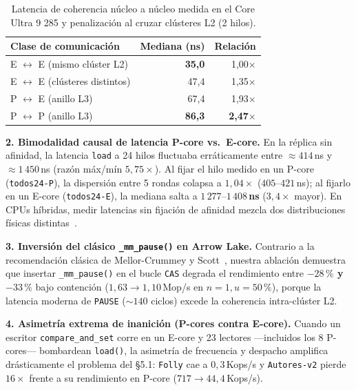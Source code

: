 \documentclass[10pt,twocolumn,a4paper]{article}
\begin{document}
\begin{table}[H]
\centering
\caption{Latencia de coherencia núcleo a núcleo medida en el Core Ultra 9 285 y penalización al cruzar clústeres L2 (2 hilos).}
\label{tab:c2c}
\footnotesize
\begin{tabular}{@{}l r r@{}}
\toprule
\textbf{Clase de comunicación} & \textbf{Mediana (ns)} & \textbf{Relación} \\
\midrule
E $\leftrightarrow$ E (mismo clúster L2) & \textbf{35{,}0} & 1{,}00$\times$ \\
E $\leftrightarrow$ E (clústeres distintos) & 47{,}4 & 1{,}35$\times$ \\
P $\leftrightarrow$ E (anillo L3) & 67{,}4 & 1{,}93$\times$ \\
P $\leftrightarrow$ P (anillo L3) & \textbf{86{,}3} & \textbf{2{,}47$\times$} \\
\bottomrule
\end{tabular}
\end{table}

\textbf{2. Bimodalidad causal de latencia P-core vs.\ E-core.} En la réplica sin afinidad, la latencia \texttt{load} a 24 hilos fluctuaba erráticamente entre $\approx 414$\,ns y $\approx 1\,450$\,ns (razón máx/mín $5{,}75\times$). Al fijar el hilo medido en un P-core (\texttt{todos24-P}), la dispersión entre 5 rondas colapsa a \textbf{$1{,}04\times$} ($405\text{--}421$\,ns); al fijarlo en un E-core (\texttt{todos24-E}), la mediana salta a \textbf{$1\,277\text{--}1\,408$\,ns} ($3{,}4\times$ mayor). En CPUs híbridas, medir latencias sin fijación de afinidad mezcla dos distribuciones físicas distintas~\cite{schone2024alderlake}.

\textbf{3. Inversión del clásico \texttt{\_mm\_pause()} en Arrow Lake.} Contrario a la recomendación clásica de Mellor-Crummey y Scott~\cite{mellorcrummey1991mcs}, nuestra ablación demuestra que insertar \texttt{\_mm\_pause()} en el bucle \texttt{CAS} degrada el rendimiento entre \textbf{$-28\,\%$ y $-33\,\%$} bajo contención ($1{,}63 \to 1{,}10$\,Mop/s en $n=1, u=50\,\%$), porque la latencia moderna de \texttt{PAUSE} ($\sim 140$ ciclos) excede la coherencia intra-clúster L2.

\textbf{4. Asimetría extrema de inanición (P-cores contra E-core).} Cuando un escritor \texttt{compare\_and\_set} corre en un E-core y 23 lectores —incluidos los 8 P-cores— bombardean \texttt{load()}, la asimetría de frecuencia y despacho amplifica drásticamente el problema del \S 5.1: \texttt{Folly} cae a $0{,}3$\,Kops/s y \texttt{Autores-v2} pierde $16\times$ frente a su rendimiento en P-core ($717 \to 44{,}4$\,Kops/s).
\end{document}
